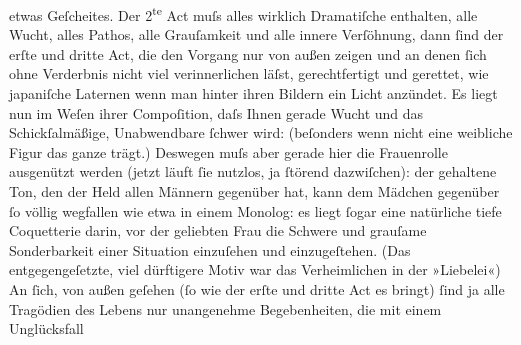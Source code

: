 \begin{ledgroupsized}[t]{13cm}
                    etwas Geſcheites.\pend
           \pstart
           {\pb}Der 2\textsuperscript{te}{ }Act muſs alles wirklich Dramatiſche
                    enthalten, alle Wucht, alles Pathos, alle Grauſamkeit und alle innere Verſöhnung, dann ſind der erſte und
                    dritte Act, die den Vorgang nur von außen zeigen und an denen ſich ohne
                    Verderbnis nicht viel verinnerlichen läſst, gerechtfertigt und gerettet, wie
                        japaniſche Laternen wenn man hinter ihren Bildern ein Licht anzündet. Es liegt
                        {\pb}nun im Weſen ihrer
                    Compoſition, daſs Ihnen gerade Wucht und das Schickſalmäßige, Unabwendbare
                    ſchwer wird: (beſonders wenn nicht eine weibliche Figur das ganze trägt.)
                    Deswegen muſs aber gerade hier die Frauenrolle ausgenützt werden (jetzt läuft
                    ſie nutzlos, ja ſtörend dazwiſchen): der gehaltene Ton, den der Held allen
                    Männern gegenüber hat, kann dem Mädchen gegenüber ſo völlig wegfallen wie etwa
                    in einem Monolog: es liegt ſogar eine natürliche tiefe Coquetterie darin, {\pb}vor der geliebten Frau die
                    Schwere und grauſame Sonderbarkeit einer Situation einzuſehen und einzugeſtehen.
                    (Das entgegengeſetzte, viel dürftigere Motiv war das Verheimlichen in der
                        »Liebelei«)\pend
           \pstart
           An ſich, von außen geſehen (ſo wie der erſte
                    und dritte Act es bringt) ſind ja alle
                    Tragödien des Lebens nur unangenehme Begebenheiten, die mit einem Unglücksfall

\end{ledgroupsized}
